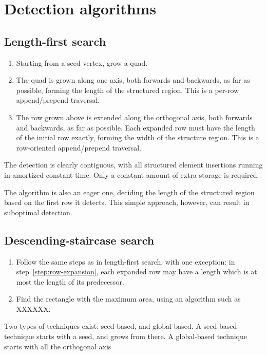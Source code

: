 \section{Detection algorithms}

\subsection{Length-first search}

\begin{enumerate}
\item Starting from a seed vertex, grow a quad.

\item The quad is grown along one axis, both forwards and backwards, as far as possible, forming the length of the structured region. This is a per-row append/prepend traversal.
\item The row grown above is extended along the orthogonal axis, both forwards and backwards, as far as possible. Each expanded row must have the length of the initial row exactly, forming the width of the structure region. This is a row-oriented append/prepend traversal.
\end{enumerate}

The detection is clearly contiguous, with all structured element insertions running in amortized constant time. Only a constant amount of extra storage is required.

The algorithm is also an eager one, deciding the length of the structured region based on the first row it detects. This simple approach, however, can result in suboptimal detection.



\subsection{Descending-staircase search}
\begin{enumerate}
\item Follow the same steps as in length-first search, with one exception: in step~\ref{step:row-expansion}, each expanded row may have a length which is at most the length of its predecessor.
\item Find the rectangle with the maximum area, using an algorithm such as XXXXXX.
\end{enumerate}



Two types of techniques exist: seed-based, and global based. A seed-based technique starts with a seed, and grows from there. A global-based technique starts with all the orthogonal axis